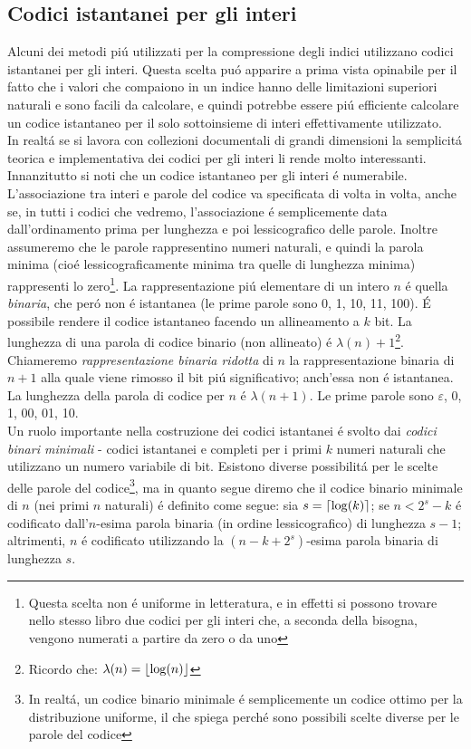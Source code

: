 \subsection{Codici istantanei per gli interi}
Alcuni dei metodi piú utilizzati per la compressione degli indici utilizzano codici istantanei per gli interi. Questa scelta puó apparire a prima vista opinabile per il fatto che i valori che compaiono in un indice hanno delle limitazioni superiori naturali e sono facili da calcolare, e quindi potrebbe essere piú efficiente calcolare un codice istantaneo per il solo sottoinsieme di interi effettivamente utilizzato.\\
In realtá se si lavora con collezioni documentali di grandi dimensioni la semplicitá teorica e implementativa dei codici per gli interi li rende molto interessanti.\\
Innanzitutto si noti che un codice istantaneo per gli interi é numerabile. L'associazione tra interi e parole del codice va specificata di volta in volta, anche se, in tutti i codici che vedremo, l'associazione é semplicemente data dall'ordinamento prima per lunghezza e poi lessicografico delle parole. Inoltre assumeremo che le parole rappresentino numeri naturali, e quindi la parola minima (cioé lessicograficamente minima tra quelle di lunghezza minima) rappresenti lo zero\footnote{Questa scelta non é uniforme in letteratura, e in effetti si possono trovare nello stesso libro due codici per gli interi che, a seconda della bisogna, vengono numerati a partire da zero o da uno}.
La rappresentazione piú elementare di un intero $n$ é quella \textit{binaria}, che peró non é istantanea (le prime parole sono 0, 1, 10, 11, 100). É possibile rendere il codice istantaneo facendo un allineamento a $k$ bit. La lunghezza di una parola di codice binario (non allineato) é $\lambda(n) + 1$\footnote{Ricordo che: $\lambda(n) = \left\lfloor \log(n) \right\rfloor$}.\\
Chiameremo \textit{rappresentazione binaria ridotta} di $n$ la rappresentazione binaria di $n + 1$ alla quale viene rimosso il bit piú significativo; anch'essa non é istantanea. La lunghezza della parola di codice per $n$ é $\lambda(n + 1)$. Le prime parole sono $\varepsilon$, 0, 1, 00, 01, 10.\\
Un ruolo importante nella costruzione dei codici istantanei é svolto dai \textit{codici binari minimali} - codici istantanei e completi per i primi $k$ numeri naturali che utilizzano un numero variabile di bit. Esistono diverse possibilitá per le scelte delle parole del codice\footnote{In realtá, un codice binario minimale é semplicemente un codice ottimo per la distribuzione uniforme, il che spiega perché sono possibili scelte diverse per le parole del codice}, ma in quanto segue diremo che il codice binario minimale di $n$ (nei primi $n$ naturali) é definito come segue: sia $s = \left\lceil \log(k) \right\rceil$; se $n < 2^s -k$ é codificato dall'$n$-esima parola binaria (in ordine lessicografico) di lunghezza $s - 1$; altrimenti, $n$ é codificato utilizzando la $(n - k + 2^s)$-esima parola binaria di lunghezza $s$.\\

